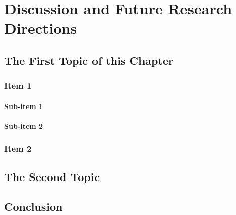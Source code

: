 \chapter{Discussion and Future Research Directions}
\label{cha:n}

\section{The First Topic of this Chapter}
\subsection{Item 1}
\subsubsection{Sub-item 1}

\subsubsection{Sub-item 2}

\subsection{Item 2}

\section{The Second Topic}

\section{Conclusion}
